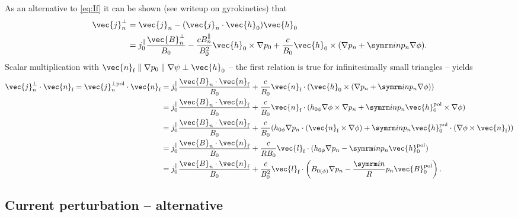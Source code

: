 As an alternative to \cref{eq:If} it can be shown (see writeup on gyrokinetics) that
\begin{align}
  \vec{j}_{n}^{\perp} &= \vec{j}_{n} - (\vec{j}_{n} \cdot \vec{h}_{0}) \vec{h}_{0} \nonumber \\
  &= j_{0}^{\parallel} \frac{\vec{B}_{n}^{\perp}}{B_{0}} - \frac{c B_{n}^{\parallel}}{B_{0}^{2}} \vec{h}_{0} \times \nabla p_{0} + \frac{c}{B_{0}} \vec{h}_{0} \times (\nabla p_{n} + \im n p_{n} \nabla \phi).
\end{align}
Scalar multiplication with $\vec{n}_{\fs} \parallel \nabla p_{0} \parallel \nabla \psi \perp \vec{h}_{0}$ -- the first relation is true for infinitesimally small triangles -- yields
\begin{align}
  \vec{j}_{n}^{\perp} \cdot \vec{n}_{\fs} = \vec{j}_{n}^{\perp \pol} \cdot \vec{n}_{\fs} &= j_{0}^{\parallel} \frac{\vec{B}_{n} \cdot \vec{n}_{\fs}}{B_{0}} + \frac{c}{B_{0}} \vec{n}_{\fs} \cdot (\vec{h}_{0} \times (\nabla p_{n} + \im n p_{n} \nabla \phi)) \nonumber \\
  &= j_{0}^{\parallel} \frac{\vec{B}_{n} \cdot \vec{n}_{\fs}}{B_{0}} + \frac{c}{B_{0}} \vec{n}_{\fs} \cdot (h_{0 \phi} \nabla \phi \times \nabla p_{n} + \im n p_{n} \vec{h}_{0}^{\pol} \times \nabla \phi) \nonumber \\
  &= j_{0}^{\parallel} \frac{\vec{B}_{n} \cdot \vec{n}_{\fs}}{B_{0}} + \frac{c}{B_{0}} (h_{0 \phi} \nabla p_{n} \cdot (\vec{n}_{\fs} \times \nabla \phi) + \im n p_{n} \vec{h}_{0}^{\pol} \cdot (\nabla \phi \times \vec{n}_{\fs})) \nonumber \\
  &= j_{0}^{\parallel} \frac{\vec{B}_{n} \cdot \vec{n}_{\fs}}{B_{0}} + \frac{c}{R B_{0}} \vec{l}_{\fs} \cdot (h_{0 \phi} \nabla p_{n} - \im n p_{n} \vec{h}_{0}^{\pol}) \nonumber \\
  &= j_{0}^{\parallel} \frac{\vec{B}_{n} \cdot \vec{n}_{\fs}}{B_{0}} + \frac{c}{B_{0}^{2}} \vec{l}_{\fs} \cdot \left( B_{0 (\phi)} \nabla p_{n} - \frac{\im n}{R} p_{n} \vec{B}_{0}^{\pol} \right). \label{eq:I3_alt}
\end{align}

\subsection{Current perturbation -- alternative}

